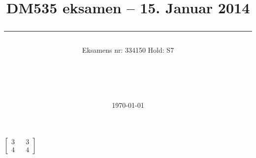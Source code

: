 \documentclass[a4paper,10pt]{article}
\title{DM535 eksamen -- 15. Januar 2014 \\ \rule{10cm}{0.5mm}}
\author{Eksamens nr: 334150 Hold: S7\\
\\\rule{5.5cm}{0.5mm}\\}
\date{\today}
\begin{document}
\maketitle

\vfill


\newpage
\tableofcontents
\newpage
$\begin{bmatrix}
3 &&3\\
4 &&4
\end{bmatrix}$
\end{document}
